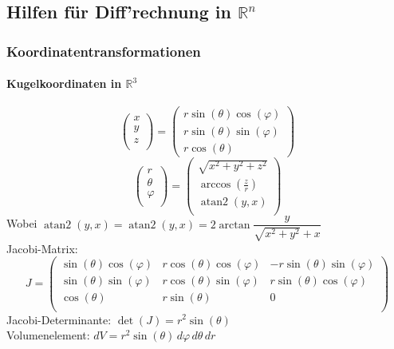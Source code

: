 \documentclass[a4paper, 9pt, DIV=24]{scrartcl}
\newcommand{\R}{\mathbb{R}}
\begin{document}
\clearpage
\subsection{Hilfen für Diff'rechnung in $\mathbb{R}^n$}
\subsubsection{Koordinatentransformationen}
\paragraph{Kugelkoordinaten in $\R^3$}
\[
\begin{pmatrix}
 x \\ y \\ z \\
\end{pmatrix}
=
\begin{pmatrix}
 r\sin(\theta)\cos(\varphi) \\
 r\sin(\theta)\sin(\varphi) \\
 r\cos(\theta)
\end{pmatrix}
\]
\[
\begin{pmatrix}
  r \\ \theta \\ \varphi \\
\end{pmatrix}
=
\begin{pmatrix}
  \sqrt{x^2 + y^2 + z^2} \\
  \arccos(\frac{z}{r}) \\
  \operatorname{atan2} (y, x) \\
\end{pmatrix}
\]
Wobei $\operatorname{atan2} (y, x) = \operatorname{atan2} (y, x)= 2 \arctan \dfrac{y}{\sqrt{x^2+y^2}+x}$\\
Jacobi-Matrix:
\[
J =
\begin{pmatrix}
 \sin(\theta)\cos(\varphi) & r\cos(\theta)\cos(\varphi) & -r\sin(\theta)\sin(\varphi) \\
 \sin(\theta)\sin(\varphi) & r\cos(\theta)\sin(\varphi) & r\sin(\theta)\cos(\varphi) \\
 \cos(\theta) & r\sin(\theta) & 0 \\
\end{pmatrix}
\]
Jacobi-Determinante: $\det(J) = r^2\sin(\theta)$\\
Volumenelement: $dV = r^2\sin(\theta)\, d\varphi\, d\theta\, dr$
\end{document}
